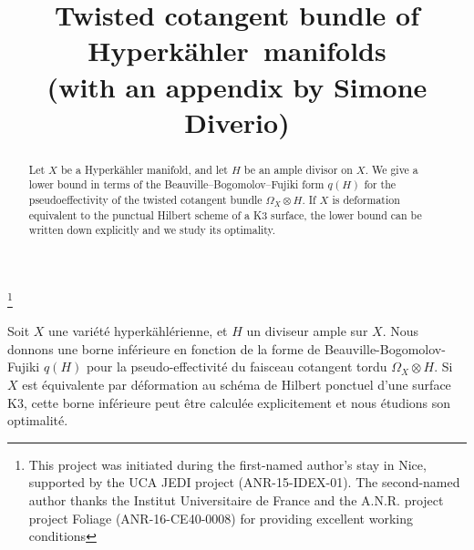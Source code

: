 \documentclass[JEP,XML,SOM,Unicode,NoEqCountersInSection,published]{cedram}
\theoremstyle{plain}
\theoremstyle{definition}
\begin{document}
\frontmatter
\title[Twisted cotangent bundle of Hyperkähler~manifolds]
{Twisted cotangent bundle of Hyperkähler~manifolds \\
(with an appendix by Simone Diverio)}

\author[\initial{F.} \lastname{Anella}]{ }
\address{Mathematisches Institut, Universität Bonn\\
Endenicher Allee 60, 53115 Bonn, Germany}
\urladdr{}

\author[\initial{A.} \lastname{Höring}]{ }
\address{Université Côte d'Azur, CNRS, LJAD\\
06108 Nice cedex 02, France}

\thanks{This project was initiated during the first-named author's stay
in Nice, supported by the UCA JEDI project (ANR-15-IDEX-01).
The second-named author thanks the Institut Universitaire de France and the A.N.R. project project Foliage (ANR-16-CE40-0008) for providing excellent working conditions}



\begin{abstract}
Let $X$ be a Hyperkähler manifold, and let $H$ be an ample divisor on $X$. We give a lower bound in terms of the Beauville--Bogomolov--Fujiki form $q(H)$ for the pseudoeffectivity of the twisted cotangent bundle $\Omega_X \otimes H$. If $X$ is deformation equivalent to the punctual Hilbert scheme of a K3 surface, the lower bound can be written down explicitly and we study its optimality.
\end{abstract}


\begin{altabstract}
Soit $X$ une variété hyper\-kählérienne, et $H$ un diviseur ample sur $X$. Nous donnons une borne inférieure en fonction de la forme de Beauville-Bogomolov-Fujiki $q(H)$ pour la pseudo-effectivité du faisceau cotangent tordu $\Omega_X \otimes H$. Si $X$ est équivalente par déformation au schéma de Hilbert ponctuel d'une surface K3, cette borne inférieure peut être calculée explicitement et nous étudions son optimalité.
\end{altabstract}
\end{document}
